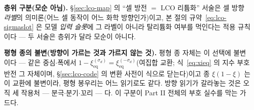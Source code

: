 \documentclass[11pt,a4paper]{article}
\newcommand{\eq}{\mathrm{eq}}
\begin{document}
\textbf{층위 구분(모순 아님).} \S\ref{sec:lco-map} 의 ``셀 방전 $=$ LCO 리튬화'' 서술은 셀 방향
\emph{라벨}의 의미론(어느 셀 동작이 어느 화학 방향인가)이고, 본 절의 규약~\eqref{eq:lco-sigmaslot} 은 모델
\emph{입력 슬롯}에 그 라벨이 아니라 탈리튬화 여부를 먹인다는 적용 규칙이다 --- 두 서술은 층위가 달라 모순이
아니다.

\textbf{평형 종의 불변(방향이 가르는 것과 가르지 않는 것).} 평형 종 자체는 이 선택에 불변이다 --- 같은
중심$\cdot$폭에서 $1-\xi_\eq^{(\sigma_d)}=\xi_\eq^{(-\sigma_d)}$(여집합 교환; 식~\eqref{eq:xieq} 의 지수
부호 반전 그 자체이며, \S\ref{sec:lco-code} 의 변환 사전이 식으로 닫는다)이고 종 $\xi(1-\xi)$ 는 이 교환에
불변이라, 평형 봉우리는 어느 읽기로도 같다. 방향 읽기가 갈라놓는 것은 오직 세 작용처 ---
분극$\cdot$분기$\cdot$꼬리 --- 다. 이 구분이 Part II 전체의 부호 실수를 막는 가드다.
\end{document}
